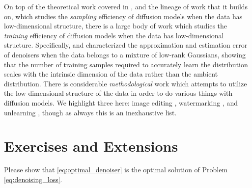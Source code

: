 \documentclass[../../book-main.tex]{subfiles}
\begin{document}
On top of the theoretical work \citep{li2024d} covered in , and the lineage of work that it builds on, which studies the \textit{sampling} efficiency of diffusion models when the data has low-dimensional structure, there is a large body of work which studies the \textit{training} efficiency of diffusion models when the data has low-dimensional structure. Specifically, \citet{chen2023score} and \citep{wang2024diffusion} characterized the approximation and estimation error of denoisers when the data belongs to a mixture of low-rank Gaussians, showing that the number of training samples required to accurately learn the distribution scales with the intrinsic dimension of the data rather than the ambient distribution. There is considerable \textit{methodological} work which attempts to utilize the low-dimensional structure of the data in order to do various things with diffusion models. We highlight three here: image editing \citep{chen2024exploring}, watermarking \citep{li2024shallow}, and unlearning \citep{chen2025dual}, though as always this is an inexhaustive list.


\section{Exercises and Extensions}

\begin{exercise}
    Please show that \eqref{eq:optimal_denoiser} is the optimal solution of Problem \eqref{eq:denoising_loss}. 
\end{exercise}
\end{document}
